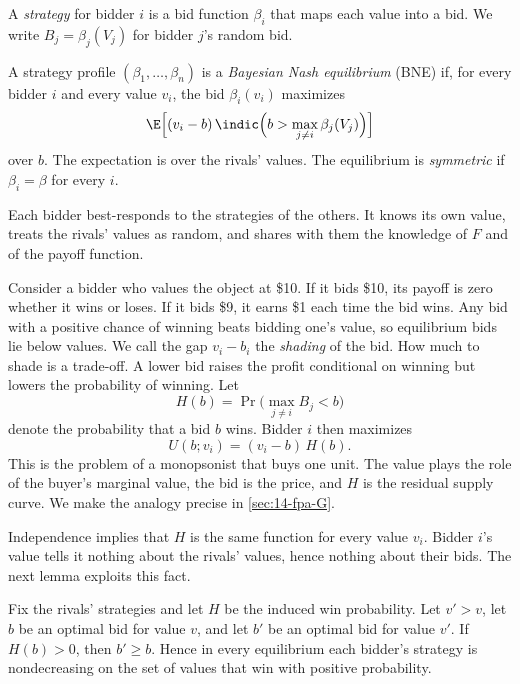 A \emph{strategy} for bidder $i$ is a bid function $\beta_i$ that maps each value into a bid. We write $B_j=\beta_j(V_j)$ for bidder $j$'s random bid.

\begin{definition}\label{def:14-bne}
A strategy profile $(\beta_1,\dots,\beta_n)$ is a \emph{Bayesian Nash equilibrium} (BNE) if, for every bidder $i$ and every value $v_i$, the bid $\beta_i(v_i)$ maximizes
\[
\E\Big[(v_i-b)\,\indic\Big(b>\max_{j\neq i}\beta_j(V_j)\Big)\Big]
\]
over $b$. The expectation is over the rivals' values. The equilibrium is \emph{symmetric} if $\beta_i=\beta$ for every $i$.
\end{definition}

Each bidder best-responds to the strategies of the others. It knows its own value, treats the rivals' values as random, and shares with them the knowledge of $F$ and of the payoff function.

Consider a bidder who values the object at \$10. If it bids \$10, its payoff is zero whether it wins or loses. If it bids \$9, it earns \$1 each time the bid wins. Any bid with a positive chance of winning beats bidding one's value, so equilibrium bids lie below values. We call the gap $v_i-b_i$ the \emph{shading} of the bid. How much to shade is a trade-off. A lower bid raises the profit conditional on winning but lowers the probability of winning. Let
\[
H(b)=\Pr\Big(\max_{j\neq i}B_j<b\Big)
\]
denote the probability that a bid $b$ wins. Bidder $i$ then maximizes
\begin{equation}\label{eq:14-fpa-objective}
U(b;v_i)=(v_i-b)\,H(b).
\end{equation}
This is the problem of a monopsonist that buys one unit. The value plays the role of the buyer's marginal value, the bid is the price, and $H$ is the residual supply curve. We make the analogy precise in \cref{sec:14-fpa-G}.

Independence implies that $H$ is the same function for every value $v_i$. Bidder $i$'s value tells it nothing about the rivals' values, hence nothing about their bids. The next lemma exploits this fact.

\begin{lemma}\label{lem:14-monotone}
Fix the rivals' strategies and let $H$ be the induced win probability. Let $v'>v$, let $b$ be an optimal bid for value $v$, and let $b'$ be an optimal bid for value $v'$. If $H(b)>0$, then $b'\ge b$. Hence in every equilibrium each bidder's strategy is nondecreasing on the set of values that win with positive probability.
\end{lemma}

